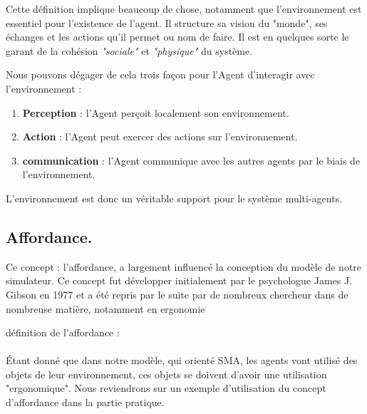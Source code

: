 \documentclass[a4paper,11pt]{article}
\begin{document}
Cette définition implique beaucoup de chose, notamment que l'environnement est essentiel pour l'existence de l'agent. Il structure sa vision du "monde", ses échanges et les actions qu'il permet ou nom de faire. Il est en quelques sorte le garant de la cohésion \textit{"sociale"} et \textit{"physique"} du système.

Nous pouvons dégager de cela trois façon pour l'Agent d'interagir avec l'environnement : 

\begin{enumerate}[label=-]
\vspace{-0.25cm}
\item \textbf{Perception} : l'Agent perçoit localement son environnement.
\vspace{-0.25cm}
\item \textbf{Action} : l'Agent peut exercer des actions sur l'environnement.
\vspace{-0.25cm}
\item \textbf{communication} : l'Agent communique avec les autres agents par le biais de l'environnement. 
\vspace{-0.25cm}
\end{enumerate}

L'environnement est donc un véritable support pour le système multi-agents.

\subsection{Affordance.}

Ce concept : l'affordance, a largement influencé la conception du modèle de notre simulateur. Ce concept fut développer initialement par le psychologue James J. Gibson\cite{Norman:1999:ACD:301153.301168} en 1977 et a été repris par le suite par de nombreux chercheur dans de nombreuse matière, notamment en ergonomie

définition de l'affordance :\\

\\ 

Étant donné que dans notre modèle, qui orienté SMA, les agents vont utilisé des objets de leur environnement, ces objets se doivent d'avoir une utilisation "ergonomique". Nous reviendrons sur un exemple d'utilisation du concept d'affordance dans la partie pratique.
\end{document}

